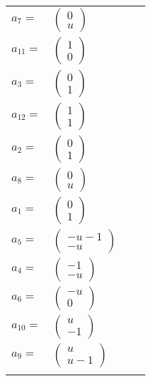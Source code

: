\documentclass[1p]{elsarticle_modified}
\theoremstyle{definition}
\begin{document}
\begin{tabular}{m{7pt} m{180pt} m{7pt} m{180pt} }
\flushright $a_{7}=$&$\begin{pmatrix}0\\u\end{pmatrix}$ \\
\flushright $a_{11}=$&$\begin{pmatrix}1\\0\end{pmatrix}$ \\
\flushright $a_{3}=$&$\begin{pmatrix}0\\1\end{pmatrix}$ \\
\flushright $a_{12}=$&$\begin{pmatrix}1\\1\end{pmatrix}$ \\
\flushright $a_{2}=$&$\begin{pmatrix}0\\1\end{pmatrix}$ \\
\flushright $a_{8}=$&$\begin{pmatrix}0\\u\end{pmatrix}$ \\
\flushright $a_{1}=$&$\begin{pmatrix}0\\1\end{pmatrix}$ \\
\flushright $a_{5}=$&$\begin{pmatrix}- u-1\\- u\end{pmatrix}$ \\
\flushright $a_{4}=$&$\begin{pmatrix}-1\\- u\end{pmatrix}$ \\
\flushright $a_{6}=$&$\begin{pmatrix}- u\\0\end{pmatrix}$ \\
\flushright $a_{10}=$&$\begin{pmatrix}u\\-1\end{pmatrix}$ \\
\flushright $a_{9}=$&$\begin{pmatrix}u\\u-1\end{pmatrix}$\\&\end{tabular}
\end{document}
